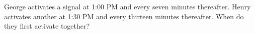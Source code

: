 George activates a signal at 1:00 PM and every seven minutes thereafter. Henry activates another at 1:30 PM and every thirteen minutes thereafter. When do they first activate together?
